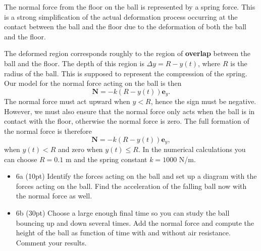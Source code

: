 \documentclass[%
oneside,                 %
final,                   %
10pt]{article}
\begin{document}
The normal force from the floor on the ball is represented by a spring force. This
is a strong simplification of the actual deformation process occurring at the contact
between the ball and the floor due to the deformation of both the ball and the floor.

The deformed region corresponds roughly to the region of \textbf{overlap} between the
ball and the floor. The depth of this region is $\Delta y = R − y(t)$, where $R$
is the radius of the ball. This is supposed to represent the compression of the spring.
Our model for the normal force acting on the ball is then
\[
\bm{N} = −k (R − y(t)) \bm{e}_y. 
\]
The normal force must act upward when $y < R$,
hence the sign must be negative.
However, we must also ensure that the normal force only acts when the ball is in
contact with the floor, otherwise the normal force is zero. The full formation of the
normal force is therefore
\[
\bm{N} = −k (R − y(t)) \bm{e}_y, 
\]
when $y(t) < R$ and zero when $y(t) \le R$.
In the numerical calculations you can choose $R=0.1$ m and the spring constant $k=1000$ N/m.

\begin{itemize}
\item 6a (10pt) Identify the forces acting on the ball and set up a diagram with the forces acting on the ball. Find the acceleration of the falling ball now with the normal force as well.

\item 6b (30pt) Choose a large enough final time so you can study the ball bouncing up and down several times. Add the normal force and compute the height of the ball as function of time with and without air resistance. Comment your results.
\end{itemize}

\noindent


\end{document}
